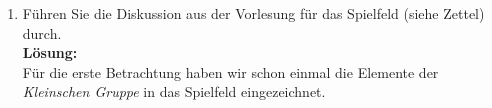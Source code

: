 \documentclass[11pt,a4paper,ngerman]{article}
\begin{document}
\begin{enumerate}[\bfseries (a)]
Daraus ergeben sich die folgenden Endkonfigurationen (Drehungen (+3 Konfigurationen) und Spiegelungen (+4 Konfigurationen nach Drehung), werden nicht extra Aufgeführt):\\

\begin{center}
\begin{tabular}{ccc}
\begin{tabular}{|cc|ccc|cc|}
\hline
&&&&&&\\
&&&&&&\\
\hline
&&&&&&\\
&&&&&&\\
&&&&&&c\\
\hline
&&&a&&&\\
&&&&&&\\
\hline
\end{tabular} &
\begin{tabular}{|cc|ccc|cc|}
\hline
&&&&&&\\
&&&&&&\\
\hline
&&&&&&a\\
&&&&&&\\
&&&c&&&\\
\hline
&&&&&&\\
&&&&&&\\
\hline
\end{tabular}&
\begin{tabular}{|cc|ccc|cc|}
\hline
&&&&c&&\\
&&&&&&\\
\hline
&&&&&&\\
&&&&&&\\
&&&&&&\\
\hline
&&&&&&\\
&&a&&&&\\
\hline
\end{tabular}
\end{tabular}
\end{center}

Das ergibt für uns insgesammt diese Konfigurationen mulipliziert mit der Anzahl von Drehungen und Spiegelungen $= 12$ Konfigurationen.

\item Führen Sie die Diskussion aus der Vorlesung für das Spielfeld (siehe Zettel) durch.\\

\textbf{Lösung:}\\
Für die erste Betrachtung haben wir schon einmal die Elemente der \emph{Kleinschen Gruppe} in das Spielfeld eingezeichnet.


\end{enumerate}
\end{document}
